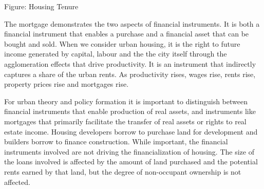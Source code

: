 \begin{center}
\end{center}

Figure: Housing Tenure 

The mortgage demonstrates the two aspects of financial instruments. It is both a financial instrument that enables a purchase and a financial asset that can be bought and sold. When we consider urban housing, it is the right to future income generated by capital, labour and the the city itself through the agglomeration effects that drive productivity. It is an instrument that indirectly captures a share of the urban rents. As productivity rises, wages rise, rents rise, property prices rise and mortgages rise. 

For urban theory and policy formation it is important to distinguish between financial instruments that enable production of real assets, and instruments like  mortgages that primarily facilitate the transfer of real assets or rights to real estate  income. Housing developers borrow to purchase land for development and builders borrow to finance construction. While important, the financial instruments involved are not driving the financialization of housing.  The size of the loans involved is affected by the amount of land purchased and the potential rents earned by that land, but the degree of non-occupant ownership is not affected.
  
